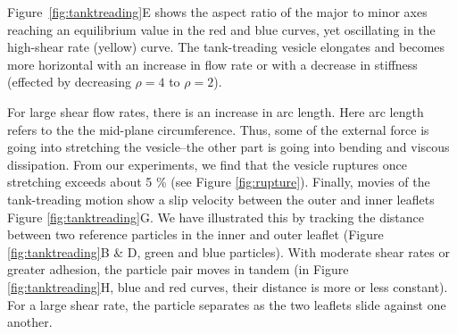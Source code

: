 %
Figure~\ref{fig:tanktreading}E shows the aspect ratio of the major to minor axes reaching an equilibrium value in the 
red and blue curves, yet oscillating in the high-shear rate (yellow) curve.
The tank-treading vesicle elongates and becomes more horizontal 
with an increase in flow rate or 
with a decrease in stiffness (effected by decreasing $\rho = 4$ to $\rho = 2$). 


For large shear flow rates, there is an increase in arc length. Here arc length
refers to the the mid-plane circumference. Thus,
some of the external force is going into stretching the vesicle--the other
part is going into bending and viscous dissipation. From our experiments, 
we find that the vesicle ruptures once stretching exceeds about 5 \%
(see Figure \ref{fig:rupture}).
Finally, movies of the tank-treading motion show a slip velocity
between the outer and inner leaflets Figure \ref{fig:tanktreading}G. We have illustrated this 
by tracking the distance between two reference particles in the inner and outer leaflet
(Figure \ref{fig:tanktreading}B \& D, green and blue particles). 
With moderate shear rates or greater adhesion, the particle pair moves in tandem
(in Figure \ref{fig:tanktreading}H, blue and red curves, their distance is more or less constant). 
For a large shear rate, the particle separates as the two leaflets slide against one another. 



